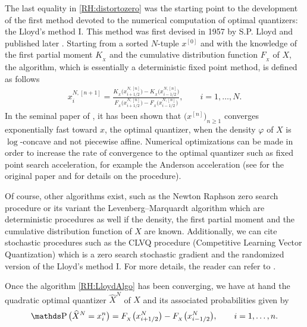The last equality in \eqref{RH:distortozero} was the starting point to the development of the first method devoted to the numerical computation of optimal quantizers: the Lloyd's method I. This method was first devised in 1957 by S.P. Lloyd and published later \cite{lloyd1982least}. Starting from a sorted $N$-tuple $x^{[0]}$ and with the knowledge of the first partial moment $K_{_X}$ and the cumulative distribution function $F_{_X}$ of $X$, the algorithm, which is essentially a deterministic fixed point method, is defined as follows
\begin{equation}\label{RH:LloydAlgo}
	\begin{aligned}
		x_i^{N, [n+1]} = \frac{ K_{_X} \big( x_{i + 1/2}^{N, [n]} \big) - K_{_X} \big( x_{i - 1/2}^{N, [n]} \big) }{ F_{_X} \big( x_{i + 1/2}^{N, [n]} \big) - F_{_X} \big( x_{i - 1/2}^{N, [n]} \big) }, \qquad i = 1, \dots, N.
	\end{aligned}
\end{equation}
In the seminal paper of \cite{kieffer1982exponential}, it has been shown that $\big( x^{[n]} \big)_{n \geq 1}$ converges exponentially fast toward $x$, the optimal quantizer, when the density $\varphi$ of $X$ is $\log$-concave and not piecewise affine. Numerical optimizations can be made in order to increase the rate of convergence to the optimal quantizer such as fixed point search acceleration, for example the Anderson acceleration (see \cite{anderson1965iterative} for the original paper and \cite{walker2011anderson} for details on the procedure).

Of course, other algorithms exist, such as the Newton Raphson zero search procedure or its variant the Levenberg–Marquardt algorithm which are deterministic procedures as well if the density, the first partial moment and the cumulative distribution function of $X$ are known. Additionally, we can cite stochastic procedures such as the CLVQ procedure (Competitive Learning Vector Quantization) which is a zero search stochastic gradient and the randomized version of the Lloyd's method I. For more details, the reader can refer to \cite{pages2018numerical,pages2016pointwise}.

Once the algorithm \eqref{RH:LloydAlgo} has been converging, we have at hand the quadratic optimal quantizer $\widehat X^N$ of $X$ and its associated probabilities given by
\begin{equation}\label{RH:probaOptimalQuantizer}
	\Prob \big( \widehat X^N = x_i^n \big) = F_{_X} \big( x_{i + 1/2}^{N} \big) - F_{_X} \big( x_{i - 1/2}^{N} \big), \qquad i = 1, \dots, n.
\end{equation}
